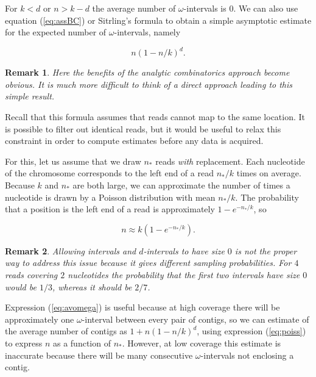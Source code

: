 \documentclass{article}
\newtheorem{remark}{Remark}
\begin{document}
For $k < d$ or $n > k-d$ the average number of $\omega$-intervals is $0$.
We can also use equation (\ref{eq:assBC}) or Sitrling's formula to obtain
a simple asymptotic estimate for the expected number of
$\omega$-intervals, namely

\begin{equation}
\label{eq:avomega}
n\left(1-n/k\right)^d.
\end{equation}

\begin{remark}
Here the benefits of the analytic combinatorics approach become obvious.
It is much more difficult to think of a direct approach leading to this
simple result.
\end{remark}

Recall that this formula assumes that reads cannot map to the same
location. It is possible to filter out identical reads, but it would be
useful to relax this constraint in order to compute estimates before any
data is acquired.

For this, let us assume that we draw $n_*$ reads \emph{with} replacement.
Each nucleotide of the chromosome corresponds to the left end of a read
$n_*/k$ times on average. Because $k$ and $n_*$ are both large, we can
approximate the number of times a nucleotide is drawn by a Poisson
distribution with mean $n_*/k$. The probability that a position is the
left end of a read is approximately $1-e^{-n_*/k}$, so


\begin{equation}
\label{eq:poiss}
n \approx k(1-e^{-n_*/k}).
\end{equation}

\begin{remark}
Allowing intervals and $d$-intervals to have size $0$ is not the proper
way to address this issue because it gives different sampling
probabilities.  For $4$ reads covering $2$ nucleotides the probability
that the first two intervals have size $0$ would be $1/3$, whereas it
should be $2/7$.
\end{remark}

Expression (\ref{eq:avomega}) is useful because at high coverage there
will be approximately one $\omega$-interval between every pair of contigs,
so we can estimate of the average number of contigs as $1 + n(1-n/k)^d$,
using expression (\ref{eq:poiss}) to express $n$ as a function of $n_*$.
However, at low coverage this estimate is inaccurate because there will be
many consecutive $\omega$-intervals not enclosing a contig.
\end{document}
